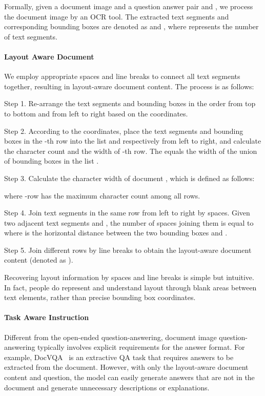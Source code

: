 \documentclass[letterpaper]{article} \usepackage{aaai24_preprint}  \usepackage{times}  \usepackage{helvet}  \usepackage{courier}  \usepackage[hyphens]{url}  \usepackage{graphicx} \urlstyle{rm} \def\UrlFont{\rm}  \usepackage{natbib}  \usepackage{caption} \frenchspacing  \setlength{\pdfpagewidth}{8.5in} \setlength{\pdfpageheight}{11in} \usepackage{algorithm}
\begin{document}
Formally, given a document image  and a question answer pair  and , we process the document image by an OCR tool.
The extracted text segments and corresponding bounding boxes are denoted as  and , where  represents the number of text segments.

\paragraph{Layout Aware Document}
We employ appropriate spaces and line breaks to connect all text segments together, resulting in layout-aware document content.
The process is as follows:

Step 1.
Re-arrange the text segments and bounding boxes in the order from top to bottom and from left to right based on the coordinates.

Step 2.
According to the coordinates, place the text segments and bounding boxes in the -th row into the list  and  respectively from left to right, and calculate the character count  and the width  of -th row.
The  equals the width of the union of bounding boxes in the list .

Step 3.
Calculate the character width of document , which is defined as follows:

where -row has the maximum character count among all rows.

Step 4.
Join text segments in the same row from left to right by spaces.
Given two adjacent text segments  and , the number of spaces joining them is equal to  where  is the horizontal distance between the two bounding boxes  and .

Step 5.
Join different rows by line breaks to obtain the layout-aware document content (denoted as ).

Recovering layout information by spaces and line breaks is simple but intuitive.
In fact, people do represent and understand layout through blank areas between text elements, rather than precise bounding box coordinates.







\paragraph{Task Aware Instruction}
\label{sec:task}

Different from the open-ended question-answering, document image question-answering typically involves explicit requirements for the answer format.
For example, DocVQA~\cite{mathewDocVQA2021} is an extractive QA task that requires answers to be extracted from the document.
However, with only the layout-aware document content and question, the model can easily generate answers that are not in the document and generate unnecessary descriptions or explanations.
\end{document}
